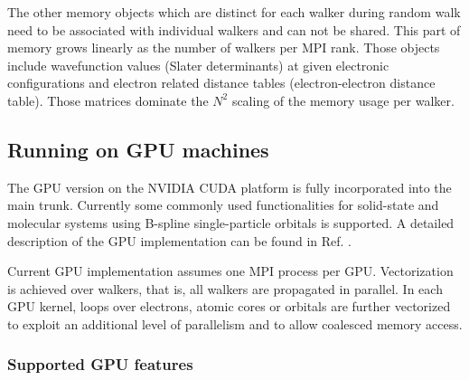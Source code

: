 The other memory objects which are distinct for each walker during random walk need to be associated with individual walkers and can not be shared. This part of memory grows linearly as the number of walkers per MPI rank. Those objects include wavefunction values (Slater determinants) at given electronic configurations and electron related distance tables (electron-electron distance table). Those matrices dominate the $N^2$ scaling of the memory usage per walker.

\subsection{Running on GPU machines}
\label{sec:gpurunning}

The GPU version on the NVIDIA CUDA platform is fully incorporated into
the main trunk. Currently some commonly used functionalities for
solid-state and molecular systems using B-spline single-particle
orbitals is supported. A detailed description of the GPU
implementation can be found in Ref. \cite{EslerKimCeperleyShulenburger2012}.

Current GPU implementation assumes one MPI process per
GPU. Vectorization is achieved over walkers, that is, all walkers are
propagated in parallel. In each GPU kernel, loops over electrons,
atomic cores or orbitals are further vectorized to exploit an
additional level of parallelism and to allow coalesced memory access.


\subsubsection{Supported GPU features}

